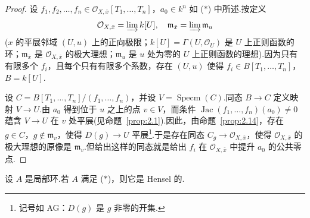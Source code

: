 \begin{proof}
设 $f_1, f_2, \ldots, f_n \in \mathcal{O}_{X, \bar{x}}[T_1, \ldots, T_n]$，$a_0 \in k^{n}$ 如 ($\ast$) 中所述.按定义
\[
\mathcal{O}_{X, \bar{x}} = \varinjlim k[U], \quad \mathfrak{m}_{\bar{x}} = \varinjlim \mathfrak{m}_{u}
\]
($x$ 的平展邻域 $(U, u)$ 上的正向极限；$k[U] = \Gamma(U, \mathcal{O}_U)$ 是 $U$ 上正则函数的环；$\mathfrak{m}_{\bar{x}}$ 是 $\mathcal{O}_{X, \bar{x}}$ 的极大理想；$\mathfrak{m}_{u}$ 是 $u$ 处为零的 $U$ 上正则函数的理想).因为只有有限多个 $f_i$，且每个只有有限多个系数，存在 $(U, u)$ 使得 $f_i \in B[T_1, \ldots, T_n]$，$B = k[U]$.

设 $C = B[T_1, \ldots, T_n]/(f_1, \ldots, f_n)$，并设 $V = \operatorname{Specm}(C)$.同态 $B \to C$ 定义映射 $V \to U$.由 $a_0$ 得到位于 $u$ 之上的点 $v \in V$，而条件 $\operatorname{Jac}(f_1, \ldots, f_n)(a_0) \neq 0$ 蕴含 $V \to U$ 在 $v$ 处平展(见命题~\ref{prop:2.1}).因此，由命题~\ref{prop:2.14}，存在 $g \in C$，$g \notin \mathfrak{m}_{v}$，使得 $D(g) \to U$ 平展\footnote{记号如 AG：$D(g)$ 是 $g$ 非零的开集.}.于是存在同态 $C_g \to \mathcal{O}_{X, \bar{x}}$，使得 $\mathcal{O}_{X, \bar{x}}$ 的极大理想的原像是 $\mathfrak{m}_{v}$.但给出这样的同态就是给出 $f_i$ 在 $\mathcal{O}_{X, \bar{x}}$ 中提升 $a_0$ 的公共零点.
\end{proof}

\begin{lemma}\label{lem:4.7}
设 $A$ 是局部环.若 $A$ 满足 ($\ast$)，则它是 Hensel 的.
\end{lemma}

